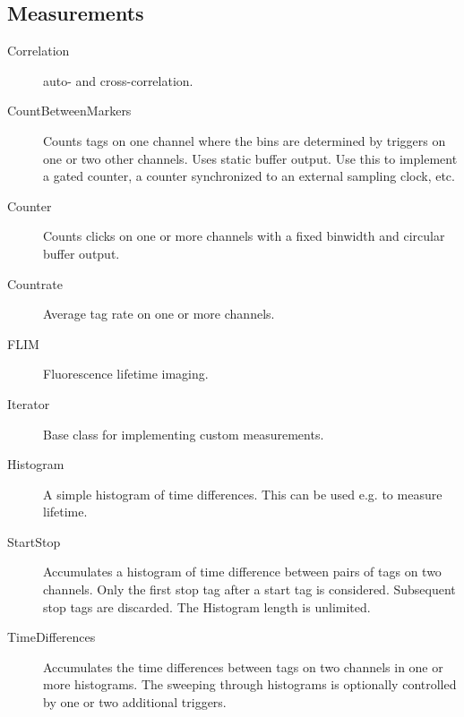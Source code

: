 \documentclass[letterpaper,10pt,english]{sphinxmanual}
\begin{document}
\subsection{Measurements}
\label{sections/api:measurements}\begin{description}
\item[{Correlation}] \leavevmode
auto- and cross-correlation.

\item[{CountBetweenMarkers}] \leavevmode
Counts tags on one channel where the bins are
determined by triggers on one or two other channels. Uses static buffer
output. Use this to implement a gated counter, a counter synchronized to
an external sampling clock, etc.

\item[{Counter}] \leavevmode
Counts clicks on one or more channels with a fixed binwidth and
circular buffer output.

\item[{Countrate}] \leavevmode
Average tag rate on one or more channels.

\item[{FLIM}] \leavevmode
Fluorescence lifetime imaging.

\item[{Iterator}] \leavevmode
Base class for implementing custom measurements.

\item[{Histogram}] \leavevmode
A simple histogram of time differences. This can be used e.g.
to measure lifetime.

\item[{StartStop}] \leavevmode
Accumulates a histogram of time difference between
pairs of tags on two channels. Only the first stop tag after a start tag is
considered. Subsequent stop tags are discarded. The Histogram length is
unlimited.

\item[{TimeDifferences}] \leavevmode
Accumulates the time differences between tags on two
channels in one or more histograms. The sweeping through
histograms is optionally controlled by one or two additional triggers.

\end{description}
\end{document}
